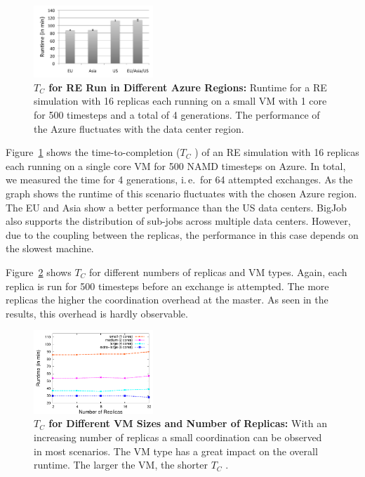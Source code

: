 \documentclass[conference,final]{IEEEtran}
\newcommand{\up}{\vspace*{-1em}}
\newcommand{\tc}{$T_{C}$ }
\newcommand{\jhanote}[1]{ {\textcolor{red} { ***SJ: #1 }}}
\newcommand{\jhanote}[1]{}
\begin{document}
\begin{figure}[t]
    \centering
        \includegraphics[width=0.4\textwidth]{performance/repex_runtime_per_region.pdf}
        \up
        \caption{\textbf{\tc for RE Run in Different Azure Regions:}
          Runtime for a RE simulation with 16 replicas each running on
          a small VM with 1 core for 500 timesteps and a total of 4
          generations. The performance of the Azure fluctuates with
          the data center region.}
    \label{fig:performance_repex_runtime_per_region}
    \up
\end{figure}

Figure~\ref{fig:performance_repex_runtime_per_region} shows the
time-to-completion (\tc) of an RE simulation with 16 replicas each
running on a single core VM for 500 NAMD timesteps on Azure. In total,
we measured the time for 4 generations, i.\,e.\ for 64 attempted
exchanges. As the graph shows the runtime of this scenario fluctuates
with the chosen Azure region. The EU and Asia show a better
performance than the US data centers. BigJob also supports the
distribution of sub-jobs across multiple data centers. However, due to
the coupling between the replicas, the performance in this case
depends on the slowest machine.

Figure~\ref{fig:performance_repex_scaleout_vmsizes} shows \tc
for different numbers of replicas and VM types. 
Again, each replica is run for 500 timesteps before an exchange
is attempted. The more replicas the higher the coordination overhead
at the master. As seen in the results, this overhead is hardly
observable.
\begin{figure}[ht]
    \centering
        \includegraphics[width=0.4\textwidth]{performance/repex-azure.pdf}
    \caption{\textbf{\tc for Different VM Sizes and Number of Replicas:} With
    an increasing number of replicas a small coordination can be observed in most 
    scenarios. The VM type has a great impact on the overall runtime. The larger
    the VM, the shorter \tc. }
    \label{fig:performance_repex_scaleout_vmsizes}
    \up
\end{figure}
\end{document}
